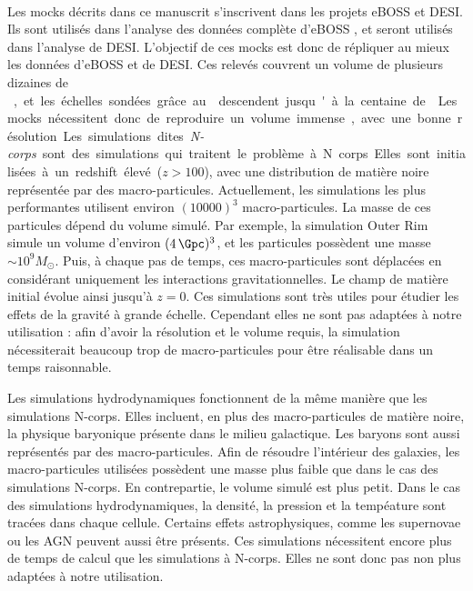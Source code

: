 \documentclass[11pt, twoside, a4paper, openright]{report}
\begin{document}
\paragraph{}
Les mocks décrits dans ce manuscrit s'inscrivent dans les projets eBOSS et DESI. Ils sont utilisés dans l'analyse \lya{} des données complète d'eBOSS \autocite{CITE:dr16}, et seront utilisés dans l'analyse \lya{} de DESI.
L'objectif de ces mocks est donc de répliquer au mieux les données \lya{} d'eBOSS et de DESI. Ces relevés couvrent un volume de plusieurs dizaines de \si{\cubic\Gpc}, et les échelles sondées grâce au \lya{} descendent jusqu'à la centaine de \si{\kpc}. Les mocks nécessitent donc de reproduire un volume immense, avec une bonne résolution.
Les simulations dites \emph{N-corps} sont des simulations qui traitent le problème à N corps.
Elles sont initialisées à un redshift élevé ($z > \num{100}$), avec une distribution de matière noire représentée par des macro-particules.
Actuellement, les simulations les plus performantes utilisent environ $(\num{10000})^3$ macro-particules.
La masse de ces particules dépend du volume simulé. Par exemple, la simulation Outer Rim \autocite{Heitmann2019} simule un volume d'environ $(\SI{4}{\Gpc})^3$, et les particules possèdent une masse $\sim 10^{9} M_{\odot}$.
Puis, à chaque pas de temps, ces macro-particules sont déplacées en considérant uniquement les interactions gravitationnelles. Le champ de matière initial évolue ainsi jusqu'à $z=0$. Ces simulations sont très utiles pour étudier les effets de la gravité à grande échelle. Cependant elles ne sont pas adaptées à notre utilisation : afin d'avoir la résolution et le volume requis, la simulation nécessiterait beaucoup trop de macro-particules pour être réalisable dans un temps raisonnable.

Les simulations hydrodynamiques fonctionnent de la même manière que les simulations N-corps. Elles incluent, en plus des macro-particules de matière noire, la physique baryonique présente dans le milieu galactique. Les baryons sont aussi représentés par des macro-particules. Afin de résoudre l'intérieur des galaxies, les macro-particules utilisées possèdent une masse plus faible que dans le cas des simulations N-corps. En contrepartie, le volume simulé est plus petit. Dans le cas des simulations hydrodynamiques, la densité, la pression et la tempéature sont tracées dans chaque cellule. Certains effets astrophysiques, comme les supernovae ou les AGN peuvent aussi être présents. 
Ces simulations nécessitent encore plus de temps de calcul que les simulations à N-corps. Elles ne sont donc pas non plus adaptées à notre utilisation.
\end{document}
